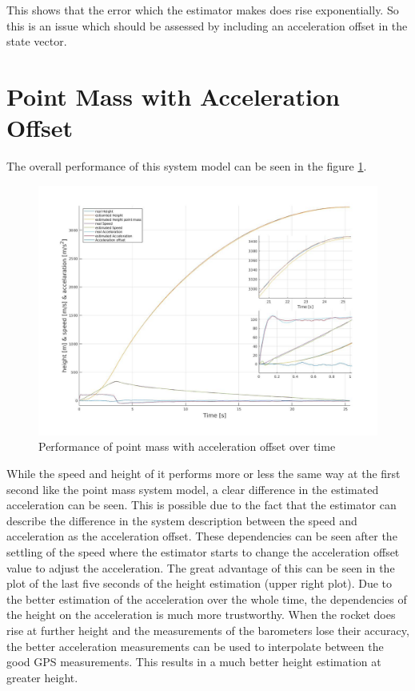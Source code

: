 This shows that the error which the estimator makes does rise exponentially.
So this is an issue which should be assessed by including an acceleration offset in the state vector.


\newpage
\section{Point Mass with Acceleration Offset}
The overall performance of this system model can be seen in the figure \ref{fig:PointMassOffsetPerformance}.

\begin{figure}[h!]
 \centering
 \includegraphics[width=.8 \textwidth]{./Pictures/PointMassOffsetPerformance.jpg}
 \caption{Performance of point mass with acceleration offset over time}
 \label{fig:PointMassOffsetPerformance}
\end{figure}

While the speed and height of it performs more or less the same way at the first second like the point mass system model,
a clear difference in the estimated acceleration can be seen.
This is possible due to the fact that the estimator can describe the difference in the system description between the speed and acceleration as the acceleration offset.
These dependencies can be seen after the settling of the speed where the estimator starts to change the acceleration offset value to adjust the acceleration.
The great advantage of this can be seen in the plot of the last five seconds of the height estimation (upper right plot).
Due to the better estimation of the acceleration over the whole time, the dependencies of the height on the acceleration is much more trustworthy.
When the rocket does rise at further height and the measurements of the barometers lose their accuracy,
the better acceleration measurements can be used to interpolate between the good GPS measurements.
This results in a much better height estimation at greater height.

